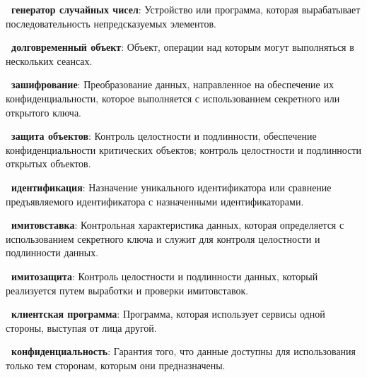 {\bf \thedefctr~генератор случайных чисел}:
Устройство или программа, которая вырабатывает последовательность 
непредсказуемых элементов.


{\bf \thedefctr~долговременный объект}:
Объект, операции над которым могут выполняться в нескольких сеансах.


{\bf \thedefctr~зашифрование}:
Преобразование данных, направленное на обеспечение их конфиденциальности,
которое выполняется с использованием секретного или открытого ключа.

{\bf \thedefctr~защита объектов}:
Контроль целостности и подлинности, обеспечение конфиденциальности критических
объектов; контроль целостности и подлинности открытых объектов.


{\bf \thedefctr~идентификация}:
Назначение уникального идентификатора или сравнение предъявляемого 
идентификатора с назначенными идентификаторами.


{\bf \thedefctr~имитовставка}:
Контрольная характеристика данных, которая определяется с использованием
секретного ключа и служит для контроля целостности и подлинности данных.

{\bf \thedefctr~имитозащита}:
Контроль целостности и подлинности данных, который реализуется путем выработки и
проверки имитовставок.

{\bf \thedefctr~клиентская программа}:
Программа, которая использует сервисы одной стороны, выступая от лица другой. 

%

{\bf \thedefctr~конфиденциальность}:
Гарантия того, что данные доступны для использования
только тем сторонам, которым они предназначены.

